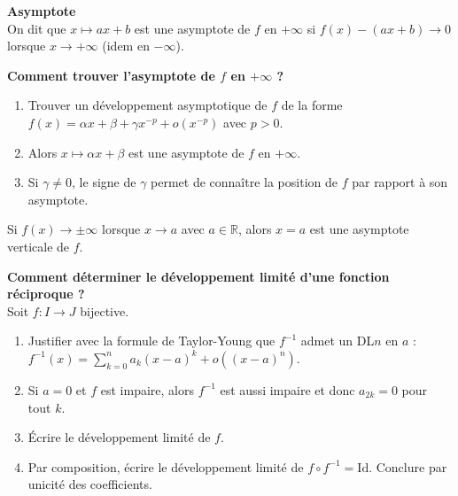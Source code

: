 
\begin{Def}\textbf{Asymptote}\\

On dit que \( x \mapsto ax + b \) est une asymptote de \( f \) en \( +\infty \) si \( f(x) - (ax + b) \to 0 \) lorsque \( x \to +\infty \) (idem en \( -\infty \)).\\
\end{Def}

\begin{Meth}\textbf{Comment trouver l’asymptote de \( f \) en \( +\infty \) ?}\\

\begin{enumerate}
    \item Trouver un développement asymptotique de \( f \) de la forme \( f(x) = \alpha x + \beta + \gamma x^{-p} + o(x^{-p}) \) avec \( p > 0 \).
    \item Alors \( x \mapsto \alpha x + \beta \) est une asymptote de \( f \) en \( +\infty \).
    \item Si \( \gamma \neq 0 \), le signe de \( \gamma \) permet de connaître la position de \( f \) par rapport à son asymptote.\\
\end{enumerate}
\end{Meth}

\begin{Rem} Si \( f(x) \to \pm\infty \) lorsque \( x \to a \) avec \( a \in \mathbb{R} \), alors \( x = a \) est une asymptote verticale de \( f \).\\
\end{Rem}



\begin{Meth}\textbf{Comment déterminer le développement limité d’une fonction réciproque ?}\\

Soit \( f : I \to J \) bijective.
\begin{enumerate}
    \item Justifier avec la formule de Taylor-Young que \( f^{-1} \) admet un DL\( n \) en \( a \) : \( f^{-1}(x) = \sum_{k=0}^{n} a_k (x-a)^k + o((x-a)^n) \).
    \item Si \( a = 0 \) et \( f \) est impaire, alors \( f^{-1} \) est aussi impaire et donc \( a_{2k} = 0 \) pour tout \( k \).
    \item Écrire le développement limité de \( f \).
    \item Par composition, écrire le développement limité de \( f \circ f^{-1} = \text{Id} \). Conclure par unicité des coefficients.\\
\end{enumerate}
\end{Meth}

